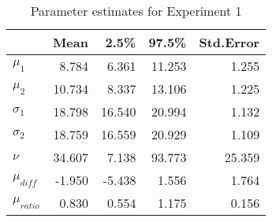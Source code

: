 \begin{table}[ht]
\centering
\begin{tabular}{lrrrr}
  \hline
  & Mean & 2.5\% & 97.5\% & Std.Error \\ 
  \hline
  $\mu_1$ & 8.784 & 6.361 & 11.253 & 1.255 \\ 
  $\mu_2$ & 10.734 & 8.337 & 13.106 & 1.225 \\ 
  $\sigma_1$ & 18.798 & 16.540 & 20.994 & 1.132 \\ 
  $\sigma_2$ & 18.759 & 16.559 & 20.929 & 1.109 \\ 
  $\nu$ & 34.607 & 7.138 & 93.773 & 25.359 \\ 
  $\mu_{diff}$ & -1.950 & -5.438 & 1.556 & 1.764 \\ 
  $\mu_{ratio}$ & 0.830 & 0.554 & 1.175 & 0.156 \\ 
   \hline
\end{tabular}
\caption{Parameter estimates for Experiment 1} 
\label{tab:res1}
\end{table}
